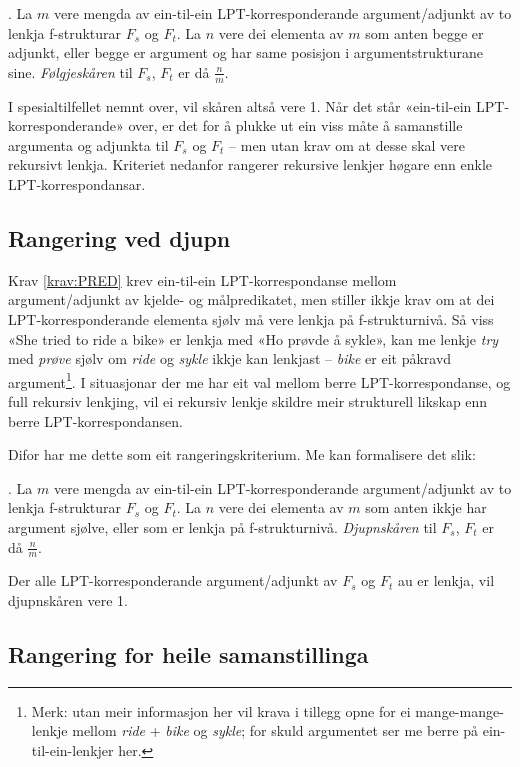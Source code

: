 \documentclass[12pt,a4paper,oneside,draft]{report}
\begin{document}
\ex. \label{krav:arg-order-rate} La $m$ vere mengda av ein-til-ein
     LPT-korresponderande argument/adjunkt av to lenkja f-strukturar
     $F_s$ og $F_t$. La $n$ vere dei elementa av $m$ som anten begge
     er adjunkt, eller begge er argument og har same posisjon i
     argumentstrukturane sine. \emph{Følgjeskåren} til $F_s$, $F_t$ er då
     $\frac{n}{m}$.

I spesialtilfellet nemnt over, vil skåren altså vere 1. Når det står
«ein-til-ein LPT-korresponderande» over, er det for å plukke ut ein
viss måte å samanstille argumenta og adjunkta til $F_s$ og $F_t$ --
men utan krav om at desse skal vere rekursivt lenkja. Kriteriet
nedanfor rangerer rekursive lenkjer høgare enn enkle
LPT-korrespondansar.

\subsection{Rangering ved djupn}
\label{sec-3.8.2}

Krav \ref{krav:PRED} krev ein-til-ein LPT-korrespondanse mellom
argument/adjunkt av kjelde- og målpredikatet, men stiller ikkje krav
om at dei LPT-korresponderande elementa sjølv må vere lenkja på
f-strukturnivå. Så viss «She tried to ride a bike» er lenkja med «Ho
prøvde å sykle», kan me lenkje \emph{try} med \emph{prøve} sjølv om \emph{ride} og
\emph{sykle} ikkje kan lenkjast -- \emph{bike} er eit påkravd argument\footnote{Merk: utan meir informasjon her vil krava i tillegg opne for
        ei mange-mange-lenkje mellom \emph{ride} + \emph{bike} og \emph{sykle}; for
        skuld argumentet ser me berre på ein-til-ein-lenkjer her. }. I
situasjonar der me har eit val mellom berre LPT-korrespondanse, og
full rekursiv lenkjing, vil ei rekursiv lenkje skildre meir
strukturell likskap enn berre LPT-korrespondansen.

Difor har me dette som eit rangeringskriterium. Me kan formalisere det
slik:

\ex. \label{krav:sub-f-rate} La $m$ vere mengda av ein-til-ein
     LPT-korresponderande argument/adjunkt av to lenkja f-strukturar
     $F_s$ og $F_t$. La $n$ vere dei elementa av $m$ som anten ikkje
     har argument sjølve, eller som er lenkja på
     f-strukturnivå. \emph{Djupnskåren} til $F_s$, $F_t$ er då
     $\frac{n}{m}$.

Der alle LPT-korresponderande argument/adjunkt av $F_s$ og $F_t$ au er
lenkja, vil djupnskåren vere 1.

\subsection{Rangering for heile samanstillinga}
\label{sec-3.8.3}
\end{document}
